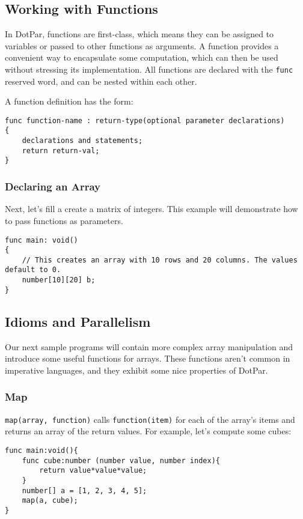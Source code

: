 \subsection{Working with Functions}
In DotPar, functions are first-class, which means they can be assigned to
variables or passed to other functions as arguments. A function provides a
convenient way to encapsulate some computation, which can then be used without
stressing its implementation. All functions are declared with the \verb=func=
reserved word, and can be nested within each other.

A function definition has the form:

\begin{verbatim}
func function-name : return-type(optional parameter declarations)
{
    declarations and statements;
    return return-val;
}
\end{verbatim}

\subsubsection{Declaring an Array}
Next, let's fill a create a matrix of integers. This example will demonstrate
how to pass functions as parameters.

\begin{verbatim}
func main: void()
{
    // This creates an array with 10 rows and 20 columns. The values default to 0.
    number[10][20] b;
}
\end{verbatim}

\subsection{Idioms and Parallelism}
Our next sample programs will contain more complex array manipulation and
introduce some useful functions for arrays. These functions aren't common in
imperative languages, and they exhibit some nice properties of DotPar.

\subsubsection{Map}
\verb=map(array, function)= calls \verb=function(item)= for each of the array's
items and returns an array of the return values.  For example, let's compute
some cubes:

\begin{verbatim}
func main:void(){
    func cube:number (number value, number index){
        return value*value*value;
    }
    number[] a = [1, 2, 3, 4, 5];
    map(a, cube);
}
\end{verbatim}

